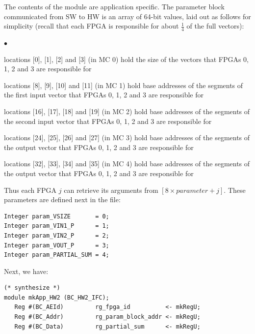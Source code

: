 \documentclass[twoside,letterpaper,11pt]{article}
\newenvironment{tightlist}%
{\begin{list}{$\bullet$}{%
    \setlength{\topsep}{0in}
    \setlength{\partopsep}{0in}
    \setlength{\itemsep}{0in}
    \setlength{\parsep}{0in}
    \setlength{\leftmargin}{1.5em}
    \setlength{\rightmargin}{0in}
    \setlength{\itemindent}{0in}
}
}%
{\end{list}
}
\begin{document}
The contents of the module are application specific.  The parameter
block communicated from SW to HW is an array of 64-bit values, laid
out as follows for simplicity (recall that each FPGA is responsible
for about $\frac{1}{4}$ of the full vectors):
\begin{tightlist}
\item locations [0], [1], [2] and [3] (in MC 0) hold the size of the
  vectors that FPGAs 0, 1, 2 and 3 are responsible for

\item locations [8], [9], [10] and [11] (in MC 1) hold base addresses
  of the segments of the first input vector that FPGAs 0, 1, 2 and 3
  are responsible for

\item locations [16], [17], [18] and [19] (in MC 2) hold base
  addresses of the segments of the second input vector that FPGAs 0,
  1, 2 and 3 are responsible for

\item locations [24], [25], [26] and [27] (in MC 3) hold base
  addresses of the segments of the output vector that FPGAs 0, 1, 2
  and 3 are responsible for

\item locations [32], [33], [34] and [35] (in MC 4) hold base
  addresses of the segments of the output vector that FPGAs 0, 1, 2
  and 3 are responsible for
\end{tightlist}
Thus each FPGA $j$ can retrieve its arguments from $[8 \times parameter
+ j]$.  These parameters are defined next in the file:
\begin{Verbatim}[frame=single, label=App\_HW\_v0.bsv]  
Integer param_VSIZE       = 0;
Integer param_VIN1_P      = 1;
Integer param_VIN2_P      = 2;
Integer param_VOUT_P      = 3;
Integer param_PARTIAL_SUM = 4;
\end{Verbatim}

Next, we have:

\begin{Verbatim}[frame=single, label=App\_HW\_v0.bsv] 
(* synthesize *)
module mkApp_HW2 (BC_HW2_IFC);
   Reg #(BC_AEId)         rg_fpga_id          <- mkRegU;
   Reg #(BC_Addr)         rg_param_block_addr <- mkRegU;
   Reg #(BC_Data)         rg_partial_sum      <- mkRegU;
\end{Verbatim}
\end{document}
